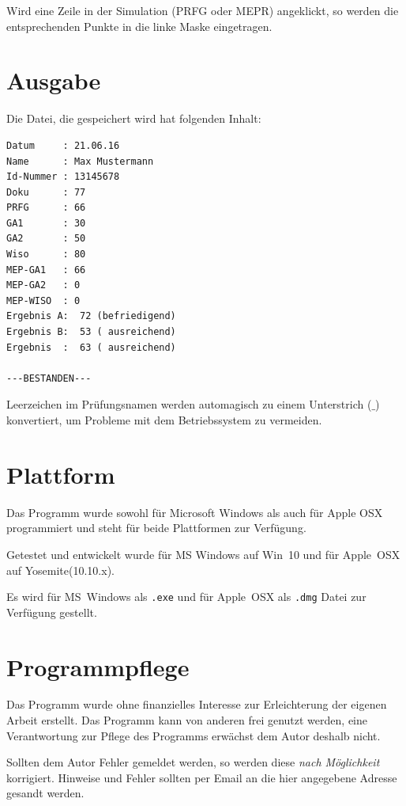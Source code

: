 \documentclass[a4paper,notitlepage,parskip=half]{scrartcl}
\newcommand{\cfile}[1]{{\texttt{#1}}}
\begin{document}
Wird eine Zeile in der Simulation (PRFG oder MEPR) angeklickt, so werden die entsprechenden Punkte in die linke
Maske eingetragen.

\section{Ausgabe}
Die Datei, die gespeichert wird hat folgenden Inhalt:
\nopagebreak[4]

\begin{minipage}[t]{\textwidth}
\begin{lstlisting}[numbers=none,caption={\cfile{Gesicherte Datei: $20160621Max\_Mustermann13145678.txt$}},label=lst:datei]
Datum     : 21.06.16
Name      : Max Mustermann
Id-Nummer : 13145678
Doku      : 77
PRFG      : 66
GA1       : 30
GA2       : 50
Wiso      : 80
MEP-GA1   : 66
MEP-GA2   : 0
MEP-WISO  : 0
Ergebnis A:  72 (befriedigend)
Ergebnis B:  53 ( ausreichend)
Ergebnis  :  63 ( ausreichend)

---BESTANDEN---
\end{lstlisting}
\end{minipage}
Leerzeichen im Prüfungsnamen werden automagisch zu einem Unterstrich ($\_$) konvertiert, um Probleme mit dem Betriebssystem zu vermeiden.

\section{Plattform}
Das Programm wurde sowohl für Microsoft Windows als auch für Apple OSX programmiert und steht für beide Plattformen zur Verfügung.

Getestet und entwickelt wurde für MS Windows auf Win~10 und für Apple~OSX auf Yosemite(10.10.x).

Es wird für MS~Windows als \texttt{.exe} und für Apple~OSX als \texttt{.dmg} Datei zur Verfügung gestellt. 

\section{Programmpflege}
Das Programm wurde ohne finanzielles Interesse zur Erleichterung der eigenen Arbeit erstellt.
Das Programm kann von anderen frei genutzt werden, eine Verantwortung zur Pflege des Programms erwächst dem Autor deshalb nicht.

Sollten dem Autor Fehler gemeldet werden, so werden diese \emph{nach Möglichkeit} korrigiert. Hinweise und Fehler sollten per Email an die hier angegebene Adresse gesandt werden.
\end{document}
